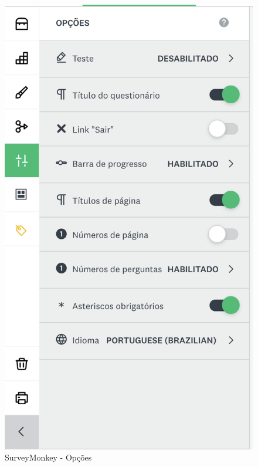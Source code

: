 \begin{figure}[ht!]
	\begin{center}
		\includegraphics[height=.32\textheight]{img/surveymonkey-form-opcoes}
		\caption{SurveyMonkey - Opções}
		\label{fig:surveymonkey-form-opcoes}
	\end{center}
\end{figure}

